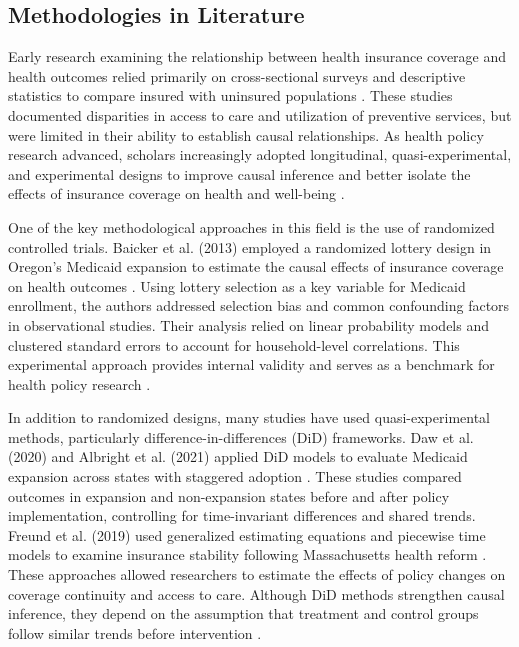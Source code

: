 \subsection{Methodologies in Literature}

Early research examining the relationship between health insurance coverage and health outcomes relied primarily on cross-sectional surveys and descriptive statistics to compare insured with uninsured populations \cite{Kronick_2009}. These studies documented disparities in access to care and utilization of preventive services, but were limited in their ability to establish causal relationships. As health policy research advanced, scholars increasingly adopted longitudinal, quasi-experimental, and experimental designs to improve causal inference and better isolate the effects of insurance coverage on health and well-being \cite{Sommers_Blendon_Orav_Epstein_2016}.

One of the key methodological approaches in this field is the use of randomized controlled trials. Baicker et al. (2013) employed a randomized lottery design in Oregon’s Medicaid expansion to estimate the causal effects of insurance coverage on health outcomes \cite{doi:10.1056/NEJMsa1212321}. Using lottery selection as a key variable for Medicaid enrollment, the authors addressed selection bias and common confounding factors in observational studies. Their analysis relied on linear probability models and clustered standard errors to account for household-level correlations. This experimental approach provides internal validity and serves as a benchmark for health policy research \cite{doi:10.1056/NEJMsa1212321} \cite{Manning1987Health}.

In addition to randomized designs, many studies have used quasi-experimental methods, particularly difference-in-differences (DiD) frameworks. Daw et al. (2020) and Albright et al. (2021) applied DiD models to evaluate Medicaid expansion across states with staggered adoption \cite{Albright_Nasioudis_Craig_Moss_Latif_Ko_Haggerty_2021}. These studies compared outcomes in expansion and non-expansion states before and after policy implementation, controlling for time-invariant differences and shared trends. Freund et al. (2019) used generalized estimating equations and piecewise time models to examine insurance stability following Massachusetts health reform \cite{Freund_LeClair_Terrin_Hanchate_Price_Moreno-Koehler_Suzukida_Kher_Byhoff_Kressin_2019}. These approaches allowed researchers to estimate the effects of policy changes on coverage continuity and access to care. Although DiD methods strengthen causal inference, they depend on the assumption that treatment and control groups follow similar trends before intervention \cite{Daw_Winkelman_Dalton_Kozhimannil_Admon_2020}.

